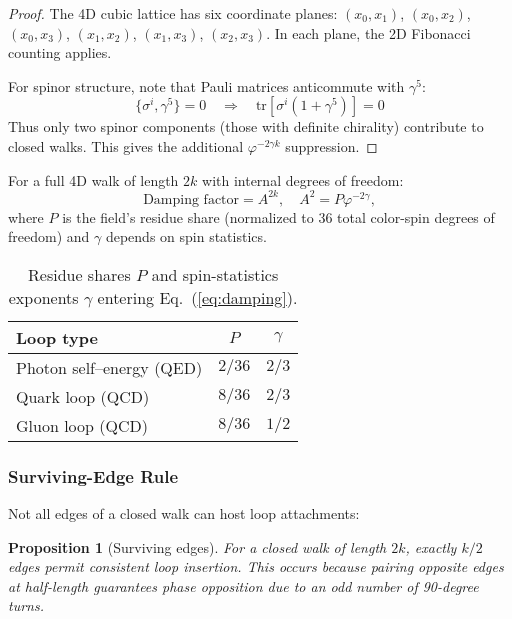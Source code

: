 \documentclass[11pt,a4paper]{article}
\newtheorem{proposition}[theorem]{Proposition}
\theoremstyle{definition}
\theoremstyle{remark}
\begin{document}
\begin{proof}
The 4D cubic lattice has six coordinate planes: $(x_0,x_1)$, $(x_0,x_2)$, $(x_0,x_3)$, $(x_1,x_2)$, $(x_1,x_3)$, $(x_2,x_3)$. In each plane, the 2D Fibonacci counting applies.

For spinor structure, note that Pauli matrices anticommute with $\gamma^5$:
\[
\{\sigma^i, \gamma^5\} = 0 \quad \Rightarrow \quad \text{tr}[\sigma^i(1+\gamma^5)] = 0
\]
Thus only two spinor components (those with definite chirality) contribute to closed walks. This gives the additional $\varphi^{-2\gamma k}$ suppression.
\end{proof}

For a full 4D walk of length $2k$ with internal degrees of freedom:
\begin{equation}
\label{eq:damping}
\text{Damping factor} = A^{2k}, \quad A^2 = P\varphi^{-2\gamma},
\end{equation}
where $P$ is the field's residue share (normalized to 36 total color-spin degrees of freedom) and $\gamma$ depends on spin statistics.

\begin{table}[ht]
\centering
\caption{Residue shares $P$ and spin-statistics exponents $\gamma$ entering Eq.~(\ref{eq:damping}).}
\label{tab:Pgamma}
\begin{tabular}{lcc}
\hline
Loop type & $P$ & $\gamma$ \\
\hline
Photon self--energy (QED) & $2/36$ & $2/3$ \\
Quark loop (QCD) & $8/36$ & $2/3$ \\
Gluon loop (QCD) & $8/36$ & $1/2$ \\
\hline
\end{tabular}
\end{table}

\subsubsection{Surviving-Edge Rule}

Not all edges of a closed walk can host loop attachments:

\begin{proposition}[Surviving edges]
\label{prop:surviving}
For a closed walk of length $2k$, exactly $k/2$ edges permit consistent loop insertion. This occurs because pairing opposite edges at half-length guarantees phase opposition due to an odd number of 90-degree turns.
\end{proposition}
\end{document}
